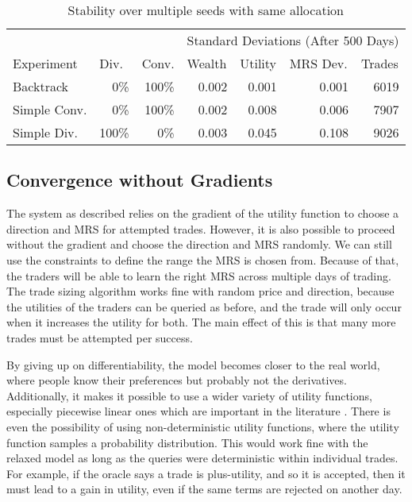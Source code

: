 \documentclass[12pt,a4paper,titlepage]{article}
\begin{document}
\begin{table}[h]
  \begin{tabular}{l|rr|rrrr}
    & \multicolumn{1}{l}{} & \multicolumn{1}{l}{} & \multicolumn{ 4}{|c}{Standard Deviations (After 500 Days)} \\ 
    Experiment & \multicolumn{1}{l}{Div.} & \multicolumn{1}{l|}{Conv.} & \multicolumn{1}{l}{Wealth} & \multicolumn{1}{l}{Utility} & \multicolumn{1}{l}{MRS Dev.} & \multicolumn{1}{l}{Trades} \\ 
    \hline
    Backtrack & 0\% & 100\% & 0.002 & 0.001 & 0.001 & 6019 \\ 
    Simple Conv. & 0\% & 100\% & 0.002 & 0.008 & 0.006 & 7907 \\ 
    Simple Div. & 100\% & 0\% & 0.003 & 0.045 & 0.108 & 9026 \\ 
  \end{tabular}
  \caption{Stability over multiple seeds with same allocation}
  \label{tab:stable}
\end{table}



\subsection{Convergence without Gradients}\label{nograd}
The system as described relies on the gradient of the utility function to choose a direction and MRS for attempted trades.
However, it is also possible to proceed without the gradient and choose the direction and MRS randomly.
We can still use the constraints to define the range the MRS is chosen from.
Because of that, the traders will be able to learn the right MRS across multiple days of trading.
The trade sizing algorithm works fine with random price and direction, because the utilities of the traders can be queried as before, and the trade will only occur when it increases the utility for both.
The main effect of this is that many more trades must be attempted per success.

By giving up on differentiability, the model becomes closer to the real world, where people know their preferences but probably not the derivatives.
Additionally, it makes it possible to use a wider variety of utility functions, especially piecewise linear ones which are important in the literature \cite{chen}.
There is even the possibility of using non-deterministic utility functions, where the utility function samples a probability distribution.
This would work fine with the relaxed model as long as the queries were deterministic within individual trades.
For example, if the oracle says a trade is plus-utility, and so it is accepted, then it must lead to a gain in utility, even if the same terms are rejected on another day.
\end{document}
